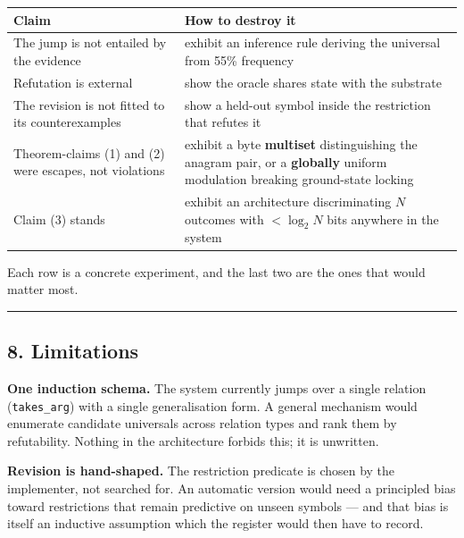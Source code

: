 \documentclass[
  11pt,
  a4paper,
]{article}
\begin{document}
\begin{longtable}[]{@{}
  >{\raggedright\arraybackslash}p{}
  >{\raggedright\arraybackslash}p{}@{}}
\toprule\noalign{}
\begin{minipage}[b]{\linewidth}\raggedright
Claim
\end{minipage} & \begin{minipage}[b]{\linewidth}\raggedright
How to destroy it
\end{minipage} \\
\midrule\noalign{}
\endhead
\bottomrule\noalign{}
\endlastfoot
The jump is not entailed by the evidence & exhibit an inference rule
deriving the universal from 55\% frequency \\
Refutation is external & show the oracle shares state with the
substrate \\
The revision is not fitted to its counterexamples & show a held-out
symbol inside the restriction that refutes it \\
Theorem-claims (1) and (2) were escapes, not violations & exhibit a byte
\textbf{multiset} distinguishing the anagram pair, or a
\textbf{globally} uniform modulation breaking ground-state locking \\
Claim (3) stands & exhibit an architecture discriminating \(N\) outcomes
with \(< \log_2 N\) bits anywhere in the system \\
\end{longtable}

Each row is a concrete experiment, and the last two are the ones that
would matter most.

\begin{center}\rule{0.5\linewidth}{0.5pt}\end{center}

\subsection{8. Limitations}\label{limitations}

\textbf{One induction schema.} The system currently jumps over a single
relation (\texttt{takes\_arg}) with a single generalisation form. A
general mechanism would enumerate candidate universals across relation
types and rank them by refutability. Nothing in the architecture forbids
this; it is unwritten.

\textbf{Revision is hand-shaped.} The restriction predicate is chosen by
the implementer, not searched for. An automatic version would need a
principled bias toward restrictions that remain predictive on unseen
symbols --- and that bias is itself an inductive assumption which the
register would then have to record.
\end{document}
